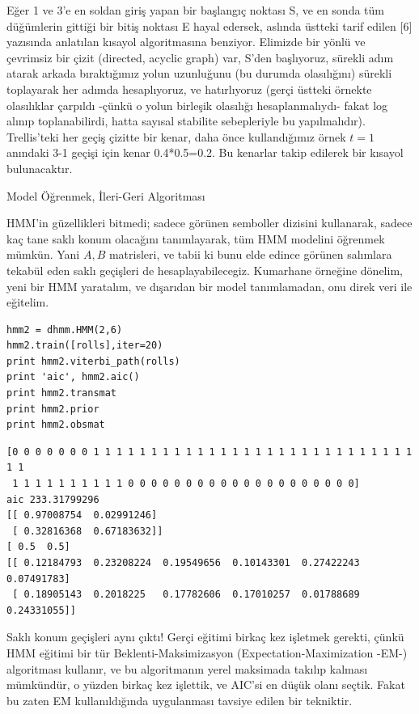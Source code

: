 \documentclass[12pt,fleqn]{article}\usepackage{../../common}
\begin{document}
Eğer 1 ve 3'e en soldan giriş yapan bir başlangıç noktası S, ve en sonda
tüm düğümlerin gittiği bir bitiş noktası E hayal edersek, aslında üstteki
tarif edilen [6] yazısında anlatılan kısayol algoritmasına
benziyor. Elimizde bir yönlü ve çevrimsiz bir çizit (directed, acyclic
graph) var, S'den başlıyoruz, sürekli adım atarak arkada bıraktığımız yolun
uzunluğunu (bu durumda olasılığını) sürekli toplayarak her adımda
hesaplıyoruz, ve hatırlıyoruz (gerçi üstteki örnekte olasılıklar çarpıldı
-çünkü o yolun birleşik olasılığı hesaplanmalıydı- fakat log alınıp
toplanabilirdi, hatta sayısal stabilite sebepleriyle bu
yapılmalıdır). Trellis'teki her geçiş çizitte bir kenar, daha önce
kullandığımız örnek $t=1$ anındaki 3-1 geçişi için kenar 0.4*0.5=0.2. Bu
kenarlar takip edilerek bir kısayol bulunacaktır.

Model Öğrenmek, İleri-Geri Algoritması

HMM'in güzellikleri bitmedi; sadece görünen semboller dizisini kullanarak,
sadece kaç tane saklı konum olacağını tanımlayarak, tüm HMM modelini
öğrenmek mümkün. Yani $A,B$ matrisleri, ve tabii ki bunu elde edince
görünen salımlara tekabül eden saklı geçişleri de
hesaplayabilecegiz. Kumarhane örneğine dönelim, yeni bir HMM yaratalım, ve
dışarıdan bir model tanımlamadan, onu direk veri ile eğitelim.

\begin{verbatim}
hmm2 = dhmm.HMM(2,6)
hmm2.train([rolls],iter=20)
print hmm2.viterbi_path(rolls)
print 'aic', hmm2.aic()
print hmm2.transmat
print hmm2.prior
print hmm2.obsmat
\end{verbatim}

\begin{verbatim}
[0 0 0 0 0 0 0 1 1 1 1 1 1 1 1 1 1 1 1 1 1 1 1 1 1 1 1 1 1 1 1 1 1 1 1 1 1
 1 1 1 1 1 1 1 1 1 1 0 0 0 0 0 0 0 0 0 0 0 0 0 0 0 0 0 0 0 0]
aic 233.31799296
[[ 0.97008754  0.02991246]
 [ 0.32816368  0.67183632]]
[ 0.5  0.5]
[[ 0.12184793  0.23208224  0.19549656  0.10143301  0.27422243  0.07491783]
 [ 0.18905143  0.2018225   0.17782606  0.17010257  0.01788689  0.24331055]]
\end{verbatim}

Saklı konum geçişleri aynı çıktı! Gerçi eğitimi birkaç kez işletmek gerekti,
çünkü HMM eğitimi bir tür Beklenti-Maksimizasyon (Expectation-Maximization -EM-)
algoritması kullanır, ve bu algoritmanın yerel maksimada takılıp kalması
mümkündür, o yüzden birkaç kez işlettik, ve AIC'si en düşük olanı seçtik. Fakat
bu zaten EM kullanıldığında uygulanması tavsiye edilen bir tekniktir.
\end{document}
